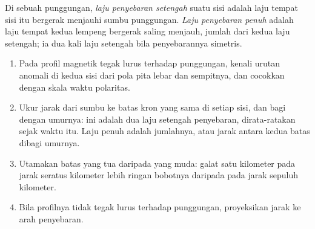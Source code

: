 \begin{omfigure}
\par{}
\label{fig:b1:plate-kinematics:stripes}
\end{omfigure}

\begin{definition}\label{def:b1:plate-kinematics:spreading-rate}
Di sebuah punggungan, \emph{laju penyebaran setengah} suatu sisi adalah laju tempat  sisi itu bergerak menjauhi sumbu punggungan. \emph{Laju penyebaran penuh} adalah laju tempat kedua lempeng bergerak saling menjauh, jumlah dari kedua laju setengah; ia dua kali laju setengah bila penyebarannya simetris.
\end{definition}

\begin{method}\label{met:b1:plate-kinematics:rate}
\begin{enumerate}
  \item Pada profil magnetik tegak lurus terhadap punggungan, kenali urutan anomali di kedua sisi dari pola pita lebar dan sempitnya, dan cocokkan dengan skala waktu polaritas.
  \item Ukur jarak dari sumbu ke batas kron yang sama di setiap sisi, dan bagi dengan umurnya: ini adalah dua laju setengah penyebaran, dirata-ratakan sejak waktu itu. Laju penuh adalah jumlahnya, atau jarak antara kedua batas dibagi umurnya.
  \item Utamakan batas yang tua daripada yang muda: galat satu kilometer pada jarak seratus kilometer lebih ringan bobotnya daripada pada jarak sepuluh kilometer.
  \item Bila profilnya tidak tegak lurus terhadap punggungan, proyeksikan jarak ke arah penyebaran.
\end{enumerate}
\end{method}

